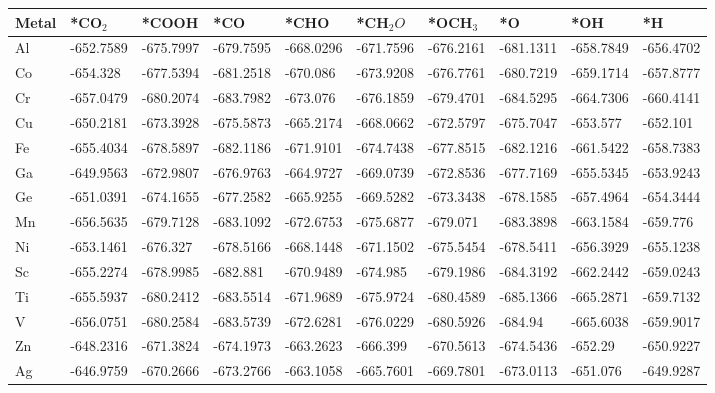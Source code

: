 \begin{table}[h]
    \centering
    {\fontsize{6}{12}\selectfont %
    \begin{tabular}{*{10}{l}}
      \hline
      Metal & *CO$_2$ & *COOH    & *CO       & *CHO      & *CH$_2O$  & *OCH$_3$  & *O        & *OH       & *H        \\
      \hline
      Al	& -652.7589	&-675.7997	&-679.7595	&-668.0296	&-671.7596	&-676.2161	&-681.1311	&-658.7849	&-656.4702 \\
      Co	& -654.328  &-677.5394	&-681.2518	&-670.086	  &-673.9208	&-676.7761	&-680.7219	&-659.1714	&-657.8777 \\
      Cr	& -657.0479	&-680.2074	&-683.7982	&-673.076	  &-676.1859	&-679.4701	&-684.5295	&-664.7306	&-660.4141 \\
      Cu	& -650.2181	&-673.3928	&-675.5873	&-665.2174	&-668.0662	&-672.5797	&-675.7047	&-653.577	  &-652.101  \\
      Fe	& -655.4034	&-678.5897	&-682.1186	&-671.9101	&-674.7438	&-677.8515	&-682.1216	&-661.5422	&-658.7383 \\
      Ga	& -649.9563	&-672.9807	&-676.9763	&-664.9727	&-669.0739	&-672.8536	&-677.7169	&-655.5345	&-653.9243 \\
      Ge	& -651.0391	&-674.1655	&-677.2582	&-665.9255	&-669.5282	&-673.3438	&-678.1585	&-657.4964	&-654.3444 \\
      Mn	& -656.5635	&-679.7128	&-683.1092	&-672.6753	&-675.6877	&-679.071	  &-683.3898	&-663.1584	&-659.776  \\
      Ni	& -653.1461	&-676.327	  &-678.5166	&-668.1448	&-671.1502	&-675.5454	&-678.5411	&-656.3929	&-655.1238 \\
      Sc	& -655.2274	&-678.9985	&-682.881	  &-670.9489	&-674.985	  &-679.1986	&-684.3192	&-662.2442	&-659.0243 \\
      Ti	& -655.5937	&-680.2412	&-683.5514	&-671.9689	&-675.9724	&-680.4589	&-685.1366	&-665.2871	&-659.7132 \\
      V	  & -656.0751	&-680.2584	&-683.5739	&-672.6281	&-676.0229	&-680.5926	&-684.94		&-665.6038	&-659.9017 \\
      Zn	& -648.2316	&-671.3824	&-674.1973	&-663.2623	&-666.399  	&-670.5613	&-674.5436	&-652.29	  &-650.9227 \\
      Ag	& -646.9759	&-670.2666	&-673.2766	&-663.1058	&-665.7601	&-669.7801	&-673.0113	&-651.076	  &-649.9287 \\

\end{tabular}}
\end{table}

